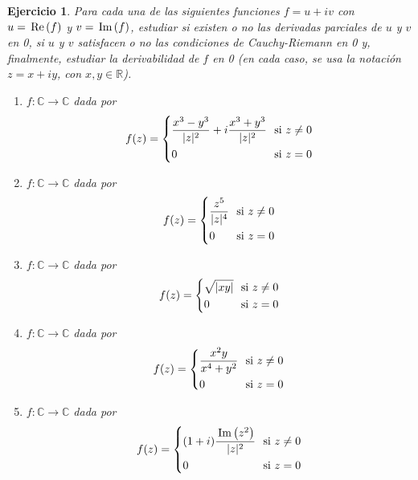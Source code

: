 \documentclass[11pt]{report}
\newcommand{\R}{\mathbb R}
\newcommand{\C}{\mathbb C}
\newcommand{\pars}[1]{\left( #1 \right)} %
\renewcommand{\Re}[1]{\,\textup{Re}\pars{#1}}
\renewcommand{\Im}[1]{\,\textup{Im}\pars{#1}}
\newtheorem{exercise}{Ejercicio}
\theoremstyle{remark}
\begin{document}
\begin{exercise}
Para cada una de las siguientes funciones $f = u+iv$ con $u=\Re{f}$ y $v = \Im{f}$, estudiar si existen o no las derivadas parciales de $u$ y $v$ en 0, si $u$ y $v$ satisfacen o no las condiciones de Cauchy-Riemann en 0 y, finalmente, estudiar la derivabilidad de $f$ en 0 (en cada caso, se usa la notación $z = x+iy$, con $x,y\in\R$).
\begin{enumerate}
    \item $f \colon \C \to \C$ dada por
    \[f(z) = \left\{
    \begin{alignedat}{2}
        & \frac{x^3-y^3}{|z|^2}+i\frac{x^3+y^3}{|z|^2} && \ \textup{ si } z \neq 0 \\
        & 0  && \ \textup{ si } z = 0
    \end{alignedat}
    \right.\]
    \item $f \colon \C \to \C$ dada por
    \[f(z) = \left\{
    \begin{alignedat}{2}
        & \frac{z^5}{|z|^4} && \ \textup{ si } z \neq 0 \\
        & 0  && \ \textup{ si } z = 0
    \end{alignedat}
    \right.\]
    \item $f \colon \C \to \C$ dada por
    \[f(z) = \left\{
    \begin{alignedat}{2}
        & \sqrt{|xy|} && \ \textup{ si } z \neq 0 \\
        & 0  && \ \textup{ si } z = 0
    \end{alignedat}
    \right.\]
    \item $f \colon \C \to \C$ dada por
    \[f(z) = \left\{
    \begin{alignedat}{2}
        & \frac{x^2y}{x^4+y^2} && \ \textup{ si } z \neq 0 \\
        & 0  && \ \textup{ si } z = 0
    \end{alignedat}
    \right.\]
    \item $f \colon \C \to \C$ dada por
    \[f(z) = \left\{
    \begin{alignedat}{2}
        & (1+i) \frac{\Im{z^2}}{|z|^2} && \ \textup{ si } z \neq 0 \\
        & 0 && \ \textup{ si } z = 0
    \end{alignedat}
    \right.\]
\end{enumerate}
\end{exercise}
\end{document}
